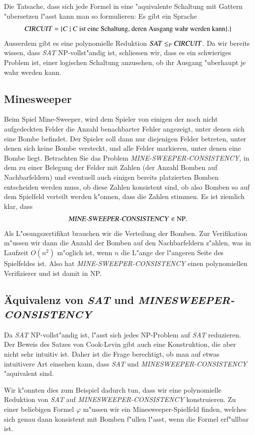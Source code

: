 Die Tatsache, dass sich jede Formel in eine "aquivalente Schaltung mit Gattern
"ubersetzen l"asst kann man so formulieren: Es gibt ein Sprache
\[
\text{\textsl{CIRCUIT}}=\{
C\;|\; \text{$C$ ist eine Schaltung, deren Ausgang wahr werden kann}\}.
\}
\]
Ausserdem gibt es eine polynomielle Reduktion
$\text{\textsl{SAT}}\le_P\text{\textsl{CIRCUIT}}$. Da wir bereits wissen,
dass \textsl{SAT} NP-vollst"andig ist, schliessen wir, dass es ein schwieriges
Problem ist, einer logischen Schaltung anzusehen, ob ihr Ausgang "uberhaupt
je wahr werden kann.

\subsection{Minesweeper}
Beim Spiel Mine-Sweeper, wird dem Spieler von einigen der noch nicht
aufgedeckten Felder die Anzahl benachbarter Fehler angezeigt, unter
denen sich eine Bombe befindet. Der Spieler soll dann nur diejenigen
Felder betreten, unter denen sich keine Bombe versteckt, und alle
Felder markieren, unter denen eine Bombe liegt. Betrachten Sie das
Problem {\it MINE-SWEEPER-CONSISTENCY}, in dem zu einer Belegung der
Felder mit Zahlen (der Anzahl Bomben auf Nachbarfeldern) und eventuell
auch einigen bereits platzierten Bomben entscheiden
werden muss, ob diese Zahlen konsistent sind, ob also Bomben so
auf dem Spielfeld verteilt werden k"onnen, dass die Zahlen stimmen.
Es ist ziemlich klar, dass
\[
\text{\textsl{MINE-SWEEPER-CONSISTENCY}}\in \text{NP}.
\]
Als L"osungszertifikat brauchen wir die Verteilung der Bomben.
Zur Verifikation m"ussen wir dann die Anzahl der Bomben auf den
Nachbarfeldern z"ahlen, was in Laufzeit $O(n^2)$ m"oglich ist,
wenn $n$ die L"ange der l"angeren Seite des Spielfeldes ist.
Also hat
\textsl{MINE-SWEEPER-CONSISTENCY} einen polynomiellen Verifizierer und
ist damit in NP.

\subsection{\"Aquivalenz von \textsl{SAT} und \textsl{MINESWEEPER-CONSISTENCY}}
Da \textsl{SAT} NP-vollst"andig ist, l"asst sich jedes NP-Problem auf
\textsl{SAT} reduzieren. Der Beweis des Satzes von Cook-Levin gibt
auch eine Konstruktion, die aber nicht sehr intuitiv ist.
Daher ist die Frage berechtigt, ob man auf etwas intuitivere Art einsehen
kann, dass
\textsl{SAT}
und
\textsl{MINESWEEPER-CONSISTENCY}
"aquivalent sind.

Wir k"onnten dies zum Beispiel dadurch tun, dass wir eine polynomielle
Reduktion von \textsl{SAT} auf \textsl{MINESWEEPER-CONSISTENCY}
konstruieren.
Zu einer beliebigen Formel $\varphi$ m"ussen wir ein Minesweeper-Spielfeld
finden, welches sich genau dann konsistent mit Bomben f"ullen l"asst,
wenn die Formel erf"ullbar ist.

